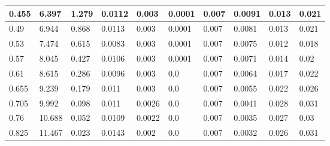 \begin{sidewaystable}[]
\begin{tabular}{|p{1cm}|p{1cm}|p{1.5cm}|p{1.5cm}|p{2cm}|p{2cm}|p{1.5cm}|p{1.5cm}|p{2.5cm}|p{2.5cm}|}
		0.455 & 6.397  & 1.279         & 0.0112            & 0.003              & 0.0001               & 0.007              & 0.0091                & 0.013             & 0.021               \\ \hline
		0.49  & 6.944  & 0.868         & 0.0113            & 0.003              & 0.0001               & 0.007              & 0.0081                & 0.013             & 0.021               \\ \hline
		0.53  & 7.474  & 0.615         & 0.0083            & 0.003              & 0.0001               & 0.007              & 0.0075                & 0.012             & 0.018               \\ \hline
		0.57  & 8.045  & 0.427         & 0.0106            & 0.003              & 0.0001               & 0.007              & 0.0071                & 0.014             & 0.02                \\ \hline
		0.61  & 8.615  & 0.286         & 0.0096            & 0.003              & 0.0                  & 0.007              & 0.0064                & 0.017             & 0.022               \\ \hline
		0.655 & 9.239  & 0.179         & 0.011             & 0.003              & 0.0                  & 0.007              & 0.0055                & 0.022             & 0.026               \\ \hline
		0.705 & 9.992  & 0.098         & 0.011             & 0.0026             & 0.0                  & 0.007              & 0.0041                & 0.028             & 0.031               \\ \hline
		0.76  & 10.688 & 0.052         & 0.0109            & 0.0022             & 0.0                  & 0.007              & 0.0035                & 0.027             & 0.03                \\ \hline
		0.825 & 11.467 & 0.023         & 0.0143            & 0.002              & 0.0                  & 0.007              & 0.0032                & 0.026             & 0.031               \\ \hline
	\end{tabular}
\end{sidewaystable}
